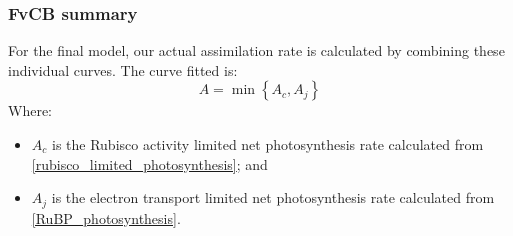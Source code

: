\documentclass[11pt]{article} %
\begin{document}
\subsubsection{FvCB summary}
For the final model, our actual assimilation rate is calculated by combining these individual curves. The curve fitted is:
\begin{equation} \label{FvCB_equation}
A = \min \left \{A_c, A_j\right \}
\end{equation}
Where:
\begin{itemize}
 \item $A_c$ is the Rubisco activity limited net photosynthesis rate calculated from \eqref{rubisco_limited_photosynthesis}; and
 \item $A_j$ is the electron transport limited net photosynthesis rate calculated from \eqref{RuBP_photosynthesis}.
\end{itemize}
\end{document}
